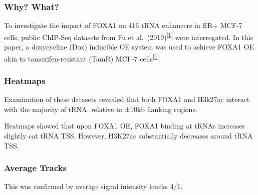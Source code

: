 \documentclass[
  12pt,
]{article}
\begin{document}
\hypertarget{why-what}{%
\subsubsection{Why? What?}\label{why-what}}

To investigate the impact of FOXA1 on 416 tRNA enhancers in ER+ MCF-7 cells, public ChIP-Seq datasets from Fu et al.~(2019)\textsuperscript{{[}\protect\hyperlink{ref-fu2019}{1}{]}} were interrogated.
In this paper, a doxycycline (Dox) inducible OE system was used to achieve FOXA1 OE akin to tamoxifen-resistant (TamR) MCF-7 cells\textsuperscript{{[}\protect\hyperlink{ref-fu2019}{1}{]}}.

\hypertarget{heatmaps}{%
\subsubsection{Heatmaps}\label{heatmaps}}

Examination of these datasets revealed that both FOXA1 and H3k27ac interact with the majority of tRNA, relative to ±10kb flanking regions.

Heatmaps showed that upon FOXA1 OE, FOXA1 binding at tRNAs increases slightly cat tRNA TSS.
However, H3K27ac substantially decreases around tRNA TSS.

\hypertarget{average-tracks}{%
\subsubsection{Average Tracks}\label{average-tracks}}

This was confirmed by average signal intensity tracks 4/1.
\end{document}

